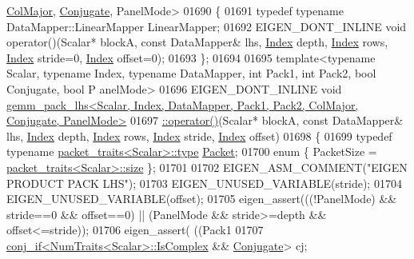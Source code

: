 \begin{DoxyCode}
      \hyperlink{group__enums_ggaacded1a18ae58b0f554751f6cdf9eb13a0cbd4bdd0abcfc0224c5fcb5e4f6669a}{ColMajor}, \hyperlink{class_eigen_1_1_conjugate}{Conjugate}, PanelMode>
01690 \{
01691   \textcolor{keyword}{typedef} \textcolor{keyword}{typename} DataMapper::LinearMapper LinearMapper;
01692   EIGEN\_DONT\_INLINE \textcolor{keywordtype}{void} operator()(Scalar* blockA, \textcolor{keyword}{const} DataMapper& lhs, \hyperlink{namespace_eigen_a62e77e0933482dafde8fe197d9a2cfde}{Index} depth, 
      \hyperlink{namespace_eigen_a62e77e0933482dafde8fe197d9a2cfde}{Index} rows, \hyperlink{namespace_eigen_a62e77e0933482dafde8fe197d9a2cfde}{Index} stride=0, \hyperlink{namespace_eigen_a62e77e0933482dafde8fe197d9a2cfde}{Index} offset=0);
01693 \};
01694 
01695 \textcolor{keyword}{template}<\textcolor{keyword}{typename} Scalar, \textcolor{keyword}{typename} Index, \textcolor{keyword}{typename} DataMapper, \textcolor{keywordtype}{int} Pack1, \textcolor{keywordtype}{int} Pack2, \textcolor{keywordtype}{bool} Conjugate, \textcolor{keywordtype}{bool} P
      anelMode>
01696 EIGEN\_DONT\_INLINE \textcolor{keywordtype}{void} 
      \hyperlink{struct_eigen_1_1internal_1_1gemm__pack__lhs}{gemm\_pack\_lhs<Scalar, Index, DataMapper, Pack1, Pack2, ColMajor, Conjugate, PanelMode>}
01697 \hyperlink{struct_eigen_1_1internal_1_1gemm__pack__lhs}{  ::operator()}(Scalar* blockA, \textcolor{keyword}{const} DataMapper& lhs, \hyperlink{namespace_eigen_a62e77e0933482dafde8fe197d9a2cfde}{Index} depth, 
      \hyperlink{namespace_eigen_a62e77e0933482dafde8fe197d9a2cfde}{Index} rows, \hyperlink{namespace_eigen_a62e77e0933482dafde8fe197d9a2cfde}{Index} stride, \hyperlink{namespace_eigen_a62e77e0933482dafde8fe197d9a2cfde}{Index} offset)
01698 \{
01699   \textcolor{keyword}{typedef} \textcolor{keyword}{typename} \hyperlink{struct_eigen_1_1internal_1_1packet__traits}{packet\_traits<Scalar>::type} \hyperlink{union_eigen_1_1internal_1_1_packet}{Packet};
01700   \textcolor{keyword}{enum} \{ PacketSize = \hyperlink{struct_eigen_1_1internal_1_1packet__traits}{packet\_traits<Scalar>::size} \};
01701 
01702   EIGEN\_ASM\_COMMENT(\textcolor{stringliteral}{"EIGEN PRODUCT PACK LHS"});
01703   EIGEN\_UNUSED\_VARIABLE(stride);
01704   EIGEN\_UNUSED\_VARIABLE(offset);
01705   eigen\_assert(((!PanelMode) && stride==0 && offset==0) || (PanelMode && stride>=depth && offset<=stride));
01706   eigen\_assert( ((Pack1%
01707   \hyperlink{struct_eigen_1_1internal_1_1conj__if}{conj\_if<NumTraits<Scalar>::IsComplex} && 
      \hyperlink{class_eigen_1_1_conjugate}{Conjugate}> cj;

\end{DoxyCode}
